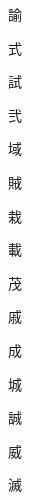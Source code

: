 \begin{spacing}{2.5}
{\Huge \begin{CJK}{UTF8}{min} 諭\end{CJK}}\hspace{0.1cm}
{\Huge \begin{CJK}{UTF8}{min} 式\end{CJK}}\hspace{0.1cm}
{\Huge \begin{CJK}{UTF8}{min} 試\end{CJK}}\hspace{0.1cm}
{\Huge \begin{CJK}{UTF8}{min} 弐\end{CJK}}\hspace{0.1cm}
{\Huge \begin{CJK}{UTF8}{min} 域\end{CJK}}\hspace{0.1cm}
{\Huge \begin{CJK}{UTF8}{min} 賊\end{CJK}}\hspace{0.1cm}
{\Huge \begin{CJK}{UTF8}{min} 栽\end{CJK}}\hspace{0.1cm}
{\Huge \begin{CJK}{UTF8}{min} 載\end{CJK}}\hspace{0.1cm}
{\Huge \begin{CJK}{UTF8}{min} 茂\end{CJK}}\hspace{0.1cm}
{\Huge \begin{CJK}{UTF8}{min} 戚\end{CJK}}\hspace{0.1cm}
{\Huge \begin{CJK}{UTF8}{min} 成\end{CJK}}\hspace{0.1cm}
{\Huge \begin{CJK}{UTF8}{min} 城\end{CJK}}\hspace{0.1cm}
{\Huge \begin{CJK}{UTF8}{min} 誠\end{CJK}}\hspace{0.1cm}
{\Huge \begin{CJK}{UTF8}{min} 威\end{CJK}}\hspace{0.1cm}
{\Huge \begin{CJK}{UTF8}{min} 滅\end{CJK}}\hspace{0.1cm}

\end{spacing}
